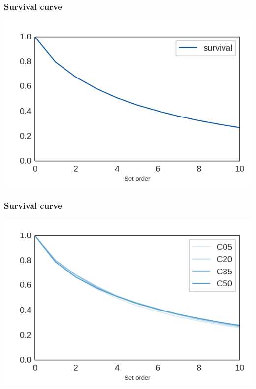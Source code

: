 \documentclass[bigger]{beamer}
\begin{document}
\begin{frame}
  \frametitle{Survival curve}
  \includegraphics[width=\textwidth]{img/survival_curve_grouped}
\end{frame}

\begin{frame}
  \frametitle{Survival curve}
  \includegraphics[width=\textwidth]{img/survival_curve_by_ab_grouped}
\end{frame}
\end{document}

